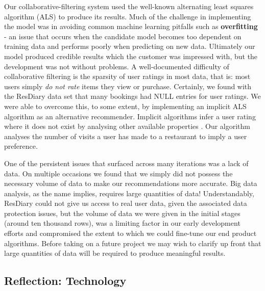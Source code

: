 \documentclass{l3proj}
\begin{document}
Our collaborative-filtering system used the well-known alternating least squares algorithm (ALS) \cite{ALS} to produce its results. Much of the challenge in implementing the model was in avoiding common machine learning pitfalls such as \textbf{overfitting} - an issue that occurs when the candidate model becomes too dependent on training data and performs poorly when predicting on new data. Ultimately our model produced credible results which the customer was impressed with, but the development was not without problems. A well-documented \cite{CollabFilter} difficulty of collaborative filtering is the sparsity of user ratings in most data, that is: most users simply \textit{do not rate} items they view or purchase. Certainly, we found with the ResDiary data set that many bookings had NULL entries for user ratings. We were able to overcome this, to some extent, by implementing an implicit ALS algorithm as an alternative recommender. Implicit algorithms infer a user rating where it does not exist by analysing other available properties \cite{ImplicitALS}. Our algorithm analyses the number of visits a user has made to a restaurant to imply a user preference.

One of the persistent issues that surfaced across many iterations was a lack of data. On multiple occasions we found that we simply did not possess the necessary volume of data to make our recommendations more accurate. Big data analysis, as the name implies, requires large quantities of data! Understandably, ResDiary could not give us access to real user data, given the associated data protection issues, but the volume of data we were given in the initial stages (around ten thousand rows), was a limiting factor in our early development efforts and compromised the extent to which we could fine-tune our end product algorithms. Before taking on a future project we may wish to clarify up front that large quantities of data will be required to produce meaningful results.

\subsection{Reflection: Technology}
\label{sec:pyreflection}

\end{document}
